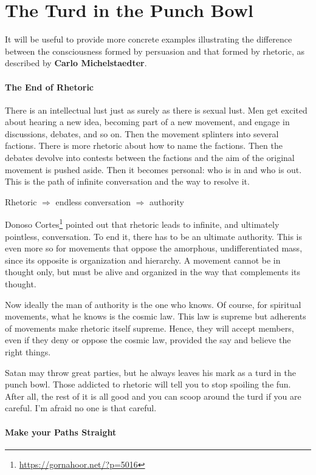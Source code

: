 \section{The Turd in the Punch Bowl}

It will be useful to provide more concrete examples illustrating the difference between the consciousness formed by persuasion and that formed by rhetoric, as described by \textbf{Carlo Michelstaedter}.

\paragraph{The End of Rhetoric}


There is an intellectual lust just as surely as there is sexual lust. Men get excited about hearing a new idea, becoming part of a new movement, and engage in discussions, debates, and so on. Then the movement splinters into several factions. There is more rhetoric about how to name the factions. Then the debates devolve into contests between the factions and the aim of the original movement is pushed aside. Then it becomes personal: who is in and who is out. This is the path of infinite conversation and the way to resolve it.

Rhetoric $\Rightarrow$ endless conversation $\Rightarrow$ authority

Donoso Cortes\footnote{\url{https://gornahoor.net/?p=5016}} pointed out that rhetoric leads to infinite, and ultimately pointless, conversation. To end it, there has to be an ultimate authority. This is even more so for movements that oppose the amorphous, undifferentiated mass, since its opposite is organization and hierarchy. A movement cannot be in thought only, but must be alive and organized in the way that complements its thought.

Now ideally the man of authority is the one who knows. Of course, for spiritual movements, what he knows is the cosmic law. This law is supreme but adherents of movements make rhetoric itself supreme. Hence, they will accept members, even if they deny or oppose the cosmic law, provided the say and believe the right things.

Satan may throw great parties, but he always leaves his mark as a turd in the punch bowl. Those addicted to rhetoric will tell you to stop spoiling the fun. After all, the rest of it is all good and you can scoop around the turd if you are careful. I'm afraid no one is that careful.

\paragraph{Make your Paths Straight}


